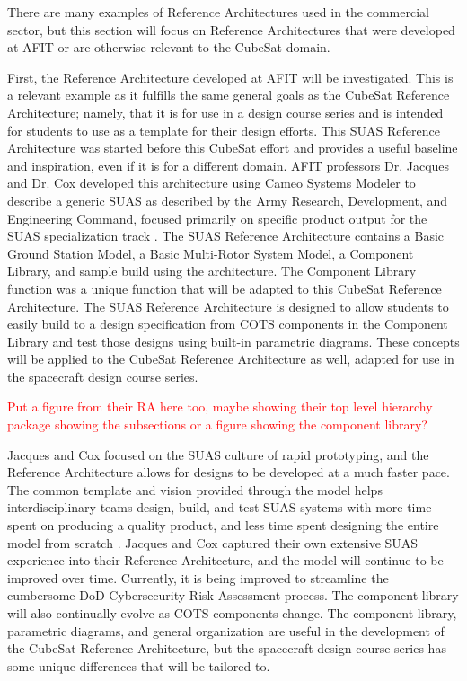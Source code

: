 There are many examples of Reference Architectures used in the commercial sector, but this section will focus on Reference Architectures that were developed at AFIT or are otherwise relevant to the CubeSat domain. 

First, the  Reference Architecture developed at AFIT will be investigated. This is a relevant example as it fulfills the same general goals as the CubeSat Reference Architecture; namely, that it is for use in a design course series and is intended for students to use as a template for their design efforts. This SUAS Reference Architecture was started before this CubeSat effort and provides a useful baseline and inspiration, even if it is for a different domain. AFIT professors Dr. Jacques and Dr. Cox developed this architecture using Cameo Systems Modeler to describe a generic SUAS as described by the Army Research, Development, and Engineering Command, focused primarily on specific product output for the SUAS specialization track \citep{Jacques2019}. The SUAS Reference Architecture contains a Basic Ground Station Model, a Basic Multi-Rotor System Model, a Component Library, and sample build using the architecture. The Component Library function was a unique function that will be adapted to this CubeSat Reference Architecture. The SUAS Reference Architecture is designed to allow students to easily build to a design specification from COTS components in the Component Library and test those designs using built-in parametric diagrams. These concepts will be applied to the CubeSat Reference Architecture as well, adapted for use in the spacecraft design course series. 

\textcolor{red}{Put a figure from their RA here too, maybe showing their top level hierarchy package showing the subsections or a figure showing the component library?}

Jacques and Cox focused on the SUAS culture of rapid prototyping, and the Reference Architecture allows for designs to be developed at a much faster pace. The common template and vision provided through the model helps interdisciplinary teams design, build, and test SUAS systems with more time spent on producing a quality product, and less time spent designing the entire model from scratch \citep{Jacques2019}. Jacques and Cox captured their own extensive SUAS experience into their Reference Architecture, and the model will continue to be improved over time. Currently, it is being improved to streamline the cumbersome DoD Cybersecurity Risk Assessment process. The component library will also continually evolve as COTS components change. The component library, parametric diagrams, and general organization are useful in the development of the CubeSat Reference Architecture, but the spacecraft design course series has some unique differences that will be tailored to. 

